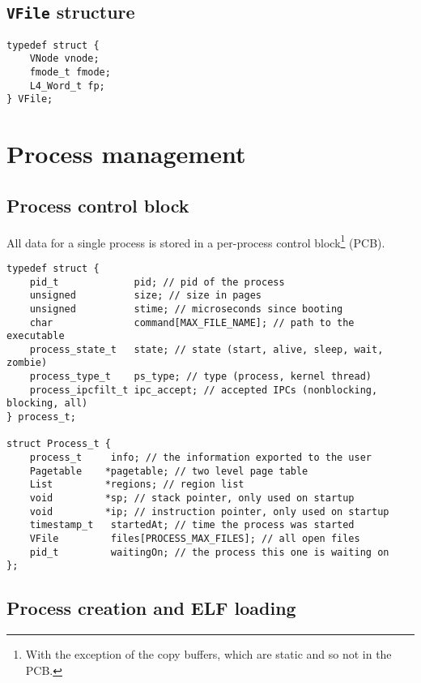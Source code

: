 \documentclass[12pt,english]{article}
\begin{document}
\subsection{\texttt{VFile} structure}

\begin{verbatim}
typedef struct {
	VNode vnode;
	fmode_t fmode;
	L4_Word_t fp;
} VFile;
\end{verbatim}



\section{Process management}

\subsection{Process control block}

All data for a single process is stored in a per-process control block\footnote{With the exception of the copy buffers, which are static and so not in the PCB.} (PCB).

\begin{verbatim}
typedef struct {
    pid_t             pid; // pid of the process
    unsigned          size; // size in pages
    unsigned          stime; // microseconds since booting
    char              command[MAX_FILE_NAME]; // path to the executable
    process_state_t   state; // state (start, alive, sleep, wait, zombie)
    process_type_t    ps_type; // type (process, kernel thread)
    process_ipcfilt_t ipc_accept; // accepted IPCs (nonblocking, blocking, all)
} process_t;

struct Process_t {
    process_t     info; // the information exported to the user
    Pagetable    *pagetable; // two level page table
    List         *regions; // region list
    void         *sp; // stack pointer, only used on startup
    void         *ip; // instruction pointer, only used on startup
    timestamp_t   startedAt; // time the process was started
    VFile         files[PROCESS_MAX_FILES]; // all open files
    pid_t         waitingOn; // the process this one is waiting on
};
\end{verbatim}

\subsection{Process creation and ELF loading} \label{sub:elf_loading}
\end{document}
